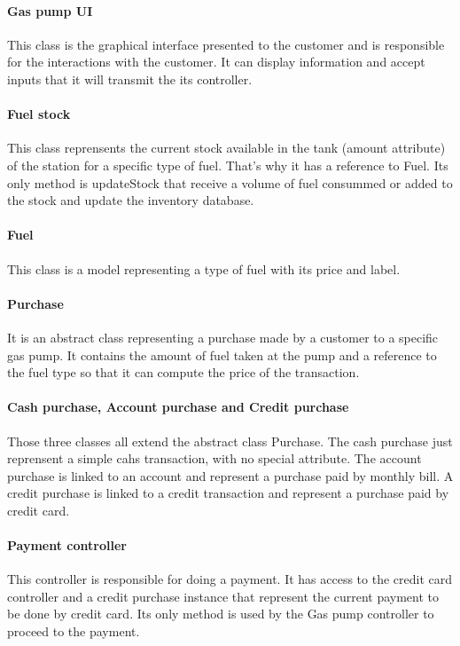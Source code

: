 \paragraph{Gas pump UI}
This class is the graphical interface presented to the customer and is responsible for the interactions with the customer. It can display information and accept inputs that it will transmit the its controller.

\paragraph{Fuel stock}
This class reprensents the current stock available in the tank (amount attribute) of the station for a specific type of fuel. That's why it has a reference to Fuel.
Its only method is updateStock that receive a volume of fuel consummed or added to the stock and update the inventory database.

\paragraph{Fuel}
This class is a model representing a type of fuel with its price and label.

\paragraph{Purchase}
It is an abstract class representing a purchase made by a customer to a specific gas pump. It contains the amount of fuel taken at the pump and a reference to the fuel type so that it can compute the price of the transaction.

\paragraph{Cash purchase, Account purchase and Credit purchase}
Those three classes all extend the abstract class Purchase.
The cash purchase just reprensent a simple cahs transaction, with no special attribute.
The account purchase is linked to an account and represent a purchase paid by monthly bill. 
A credit purchase is linked to a credit transaction and represent a purchase paid by credit card.

\paragraph{Payment controller}
This controller is responsible for doing a payment. It has access to the credit card controller and a credit purchase instance that represent the current payment to be done by credit card. Its only method is used by the Gas pump controller to proceed to the payment.

